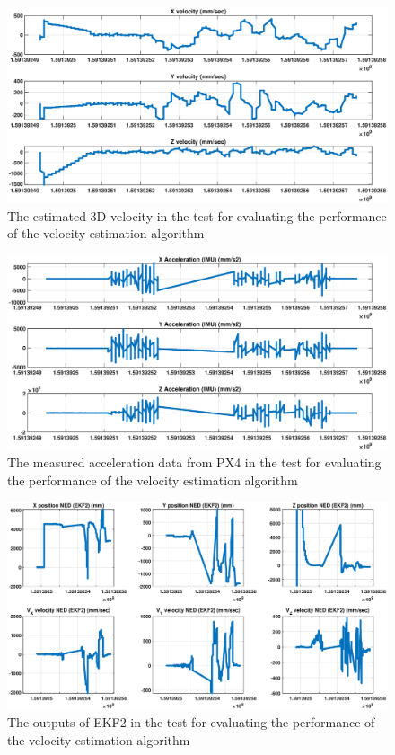 \documentclass{article}
\begin{document}
\begin{figure}[thpb]
\centering
\includegraphics[scale=0.35]{Pics/R05June_Vel.eps}
\caption{The estimated 3D velocity in the test for evaluating the performance of the velocity estimation algorithm}
\label{Fig_vel_02}
\end{figure}

\begin{figure}[thpb]
\centering
\includegraphics[scale=0.35]{Pics/R05June_Acc.eps}
\caption{The measured acceleration data from PX4 in the test for evaluating the performance of the velocity estimation algorithm}
\label{Fig_vel_03}
\end{figure}

\begin{figure}[thpb]
\centering
\includegraphics[scale=0.35]{Pics/R05June_EKF2.eps}
\caption{The outputs of EKF2 in the test for evaluating the performance of the velocity estimation algorithm}
\label{Fig_vel_04}
\end{figure}
\end{document}
